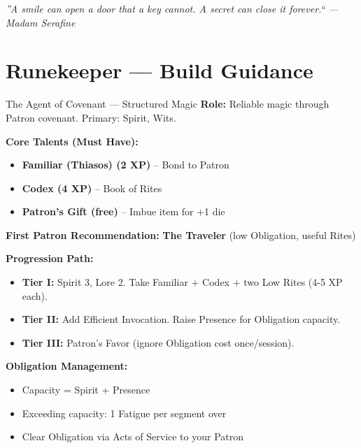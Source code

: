 \documentclass[10pt]{article}
\begin{document}
\vspace{0.5em}
\begin{center}
    {\small\sffamily\itshape ''A smile can open a door that a key cannot. A secret can close it forever.`` --- Madam Serafine}
\end{center}

\newpage


\section*{Runekeeper --- Build Guidance}

\begin{tipbox}{The Agent of Covenant --- Structured Magic}
    \textbf{Role:} Reliable magic through Patron covenant. Primary: Spirit, Wits.
    
    \textbf{Core Talents (Must Have):}
    \begin{itemize}
        \item \textbf{Familiar (Thiasos) (2 XP)} -- Bond to Patron
        \item \textbf{Codex (4 XP)} -- Book of Rites
        \item \textbf{Patron's Gift (free)} -- Imbue item for +1 die
    \end{itemize}
    
    \textbf{First Patron Recommendation:} \textbf{The Traveler} (low Obligation, useful Rites)
    
    \textbf{Progression Path:}
    \begin{itemize}
        \item \textbf{Tier I:} Spirit 3, Lore 2. Take Familiar + Codex + two Low Rites (4-5 XP each).
        \item \textbf{Tier II:} Add Efficient Invocation. Raise Presence for Obligation capacity.
        \item \textbf{Tier III:} Patron's Favor (ignore Obligation cost once/session).
    \end{itemize}
    
    \textbf{Obligation Management:}
    \begin{itemize}
        \item Capacity = Spirit + Presence
        \item Exceeding capacity: 1 Fatigue per segment over
        \item Clear Obligation via Acts of Service to your Patron
    \end{itemize}
\end{tipbox}
\end{document}
